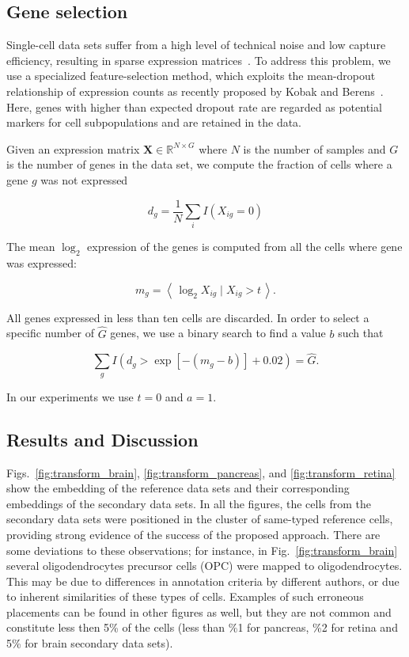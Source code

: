 \documentclass[runningheads]{llncs}
\begin{document}
\subsection{Gene selection\label{sec:gene-selection}}

Single-cell data sets suffer from a high level of technical noise and low
capture efficiency, resulting in sparse expression matrices~\cite{umi}. To
address this problem, we use a specialized feature-selection method, which
exploits the mean-dropout relationship of expression counts as recently
proposed by Kobak and Berens~\cite{art_of_using_tsne}. Here, genes with higher
than expected dropout rate are regarded as potential markers for cell
subpopulations and are retained in the data.

Given an expression matrix $\mathbf{X} \in \mathbb{R}^{N \times G}$ where $N$
is the number of samples and $G$ is the number of genes in the data set, we
compute the fraction of cells where a gene $g$ was not expressed

\begin{equation}
d_g = \frac{1}{N} \sum_i I \left ( X_{ig} = 0\right )
\end{equation}

\noindent The mean $\log_2$ expression of the genes is computed from all the
cells where gene was expressed:

\begin{equation}
m_g = \left \langle \, \log_2 X_{ig} \mid X_{ig} > t \, \right \rangle.
\end{equation}

All genes expressed in less than ten cells are discarded. In order to select a
specific number of $\hat{G}$ genes, we use a binary search to find a value $b$
such that

\begin{equation}
\sum_g I \left (d_g > \exp \left [ -(m_g - b) \right ] + 0.02 \right ) = \hat{G}.
\end{equation}

\noindent In our experiments we use $t=0$ and $a=1$.


\subsection{Results and Discussion}

Figs.~\ref{fig:transform_brain}, \ref{fig:transform_pancreas}, and
\ref{fig:transform_retina} show the embedding of the reference data sets and
their corresponding embeddings of the secondary data sets. In all the figures,
the cells from the secondary data sets were positioned in the cluster of
same-typed reference cells, providing strong evidence of the success of the
proposed approach. There are some deviations to these observations; for
instance, in Fig.~\ref{fig:transform_brain} several oligodendrocytes precursor
cells (OPC) were mapped to oligodendrocytes. This may be due to differences in
annotation criteria by different authors, or due to inherent similarities of
these types of cells. Examples of such erroneous placements can be found in
other figures as well, but they are not common and constitute less then 5\% of
the cells (less than \%1 for pancreas, \%2 for retina and 5\% for brain
secondary data sets).
\end{document}
